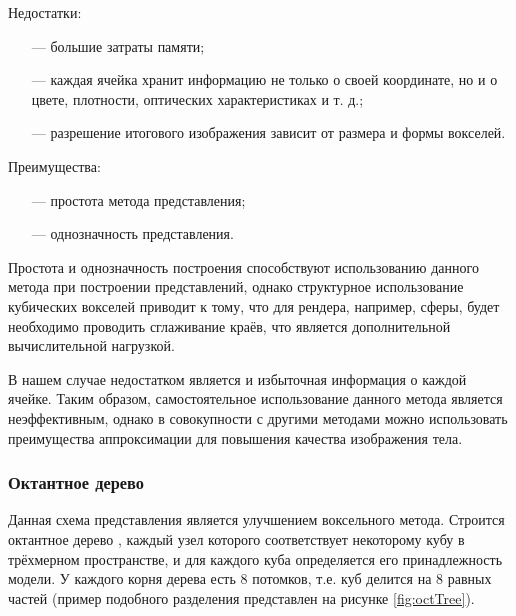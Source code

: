 Недостатки:
\begin{itemize}[leftmargin=1.6\parindent]
	\item[---] большие затраты памяти;
	\item[---] каждая ячейка хранит информацию не только о своей координате, но и о цвете, плотности, оптических характеристиках и т. д.;
	\item[---] разрешение итогового изображения зависит от размера и формы вокселей.
\end{itemize}

Преимущества:
\begin{itemize}[leftmargin=1.6\parindent]
	\item[---] простота метода представления;
	\item[---] однозначность представления.
\end{itemize}

Простота и однозначность построения способствуют использованию 
данного метода при построении представлений, однако структурное 
использование кубических вокселей приводит к тому, что для рендера, например, сферы, будет необходимо проводить сглаживание краёв, что 
является дополнительной вычислительной нагрузкой.

В нашем случае недостатком является и избыточная информация о 
каждой ячейке.
Таким образом, самостоятельное использование данного метода 
является неэффективным, однако в совокупности с другими методами можно 
использовать преимущества аппроксимации для повышения качества 
изображения тела.

\subsubsection{Октантное дерево}

Данная схема представления является улучшением воксельного метода. 
Строится октантное дерево \cite{numeric-octree}, каждый узел которого соответствует некоторому 
кубу в трёхмерном пространстве, и для каждого куба определяется его 
принадлежность модели.
У каждого корня дерева есть 8 потомков, т.е. куб 
делится на 8 равных частей (пример подобного разделения представлен на рисунке \ref{fig:octTree}).

